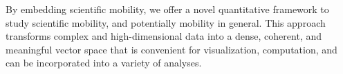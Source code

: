 \documentclass[a4paper,12pt]{article}
\begin{document}
By embedding scientific mobility, we offer a novel quantitative framework to study scientific mobility, and potentially mobility in general. 
This approach transforms complex and high-dimensional data into a dense, coherent, and meaningful vector space that is convenient for visualization, computation, and can be incorporated into a variety of analyses.



%
%
%
\begingroup
{}
\setlength\bibitemsep{1pt}
{
\small
\renewcommand{\markboth}[2]{}%
\printbibliography
}
\endgroup
\end{document}
